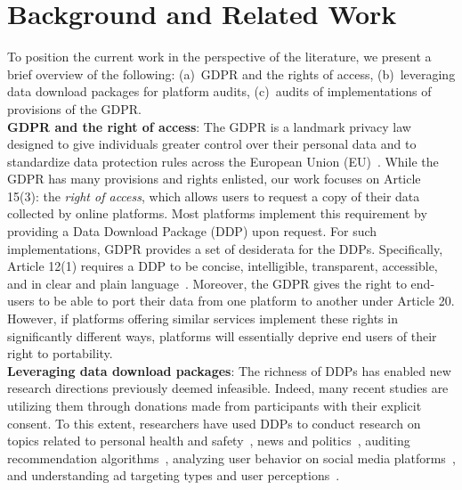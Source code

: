 \section{Background and Related Work}
\label{Sec: Related}

To position the current work in the perspective of the literature, we present a brief overview of the following: (a)~GDPR and the rights of access, (b)~leveraging data download packages for platform audits, (c)~audits of implementations of provisions of the GDPR.\\%
\noindent
\textbf{GDPR and the right of access}:
The GDPR is a landmark privacy law designed to give individuals greater control over their personal data and to standardize data protection rules across the European Union (EU)~\cite{EU2016GDPR}.
While the GDPR has many provisions and rights enlisted, our work focuses on Article 15(3): the \textit{right of access}, which allows users to request a copy of their data collected by online platforms. Most platforms implement this requirement by providing a Data Download Package (DDP) upon request.
For such implementations, GDPR provides a set of desiderata for the DDPs.
Specifically, Article 12(1) requires a DDP to be concise, intelligible, transparent, accessible, and in clear and plain language~\cite{EU2016GDPR}.
Moreover, the GDPR gives the right to end-users to be able to port their data from one platform to another under Article 20. 
However, if platforms offering similar services implement these rights in significantly different ways, platforms will essentially deprive end users of their right to portability.\\
\noindent
\textbf{Leveraging data download packages}:
The richness of DDPs has enabled new research directions previously deemed infeasible.
Indeed, many recent studies are utilizing them through donations made from participants with their explicit consent.
To this extent, researchers have used DDPs to conduct research on topics related to personal health and safety~\cite{kmetty2022identifying, yang2024coupling, alsoubai2024profiling}, news and politics~\cite{blassnig2023googling, 2023haimintegratin, hase2024can}, auditing recommendation algorithms~\cite{moller2023detecting, vombatkere2024tiktok}, analyzing user behavior on social media platforms~\cite{zannettou2024analyzing, garimella2024whatsapp}, and understanding ad targeting types and user perceptions~\cite{wei2020twitter}.\\

